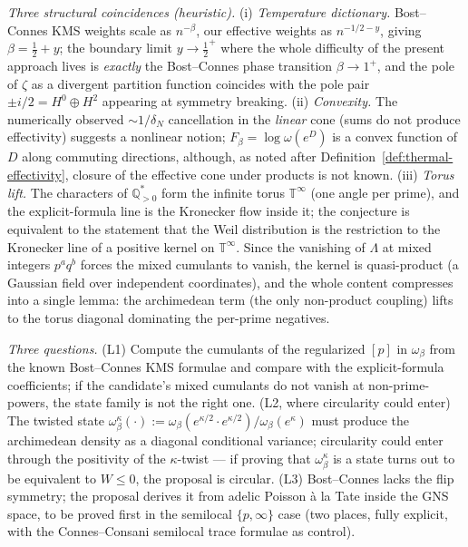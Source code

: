 \documentclass[11pt]{amsart}
\theoremstyle{definition}
\theoremstyle{remark}
\theoremstyle{definition}
\newcommand{\Q}{\mathbb{Q}}
\begin{document}
\emph{Three structural coincidences (heuristic).}
\textnormal{(i)} \emph{Temperature dictionary.}  Bost--Connes KMS weights scale as $n^{-\beta}$, our
effective weights as $n^{-1/2-y}$, giving $\beta=\tfrac12+y$; the boundary limit $y\to\tfrac12^+$ where
the whole difficulty of the present approach lives is \emph{exactly} the Bost--Connes phase transition
$\beta\to1^+$, and the pole of $\zeta$ as a divergent partition function coincides with the pole pair
$\pm i/2=H^0\oplus H^2$ appearing at symmetry breaking.
\textnormal{(ii)} \emph{Convexity.}  The numerically observed $\sim1/\delta_N$ cancellation in the
\emph{linear} cone (sums do not produce effectivity) suggests a nonlinear notion; $F_\beta=\log\omega(e^D)$
is a convex function of $D$ along commuting directions, although, as noted after
Definition~\ref{def:thermal-effectivity}, closure of the effective cone under products is not known.
\textnormal{(iii)} \emph{Torus lift.}  The characters of $\Q_{>0}^*$ form the infinite torus
$\mathbb T^\infty$ (one angle per prime), and the explicit-formula line is the Kronecker flow inside it;
the conjecture is equivalent to the statement that the Weil distribution is the restriction to the
Kronecker line of a positive kernel on $\mathbb T^\infty$.  Since the vanishing of $\Lambda$ at mixed
integers $p^aq^b$ forces the mixed cumulants to vanish, the kernel is quasi-product (a Gaussian field
over independent coordinates), and the whole content compresses into a single lemma: the archimedean
term (the only non-product coupling) lifts to the torus diagonal dominating the per-prime negatives.

\emph{Three questions.}
\textnormal{(L1)} Compute the cumulants of the regularized $[p]$ in
$\omega_\beta$ from the known Bost--Connes KMS formulae and compare with the explicit-formula
coefficients; if the candidate's mixed cumulants do not vanish at non-prime-powers, the state
family is not the right one.
\textnormal{(L2, where circularity could enter)} The twisted state
$\omega_\beta^\kappa(\cdot):=\omega_\beta(e^{\kappa/2}\cdot e^{\kappa/2})/\omega_\beta(e^\kappa)$ must
produce the archimedean density as a diagonal conditional variance; circularity could enter through
the positivity of the $\kappa$-twist --- if proving that $\omega_\beta^\kappa$ is a state turns out to
be equivalent to $W\le0$, the proposal is circular.
\textnormal{(L3)} Bost--Connes lacks the flip symmetry; the proposal derives it from
adelic Poisson à la Tate inside the GNS space, to be proved first in the semilocal $\{p,\infty\}$ case
(two places, fully explicit, with the Connes--Consani semilocal trace formulae as control).
\end{document}
